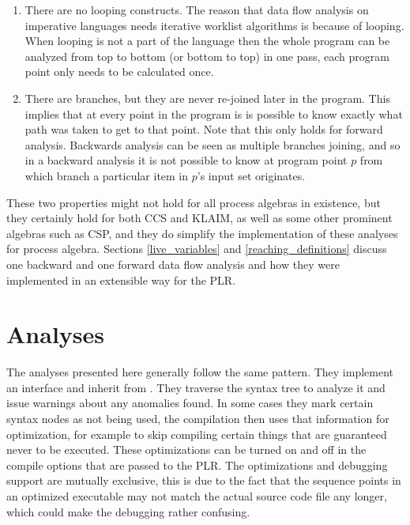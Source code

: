 	\begin{enumerate}
		\item There are no looping constructs. The reason that data flow analysis 
		on imperative languages needs iterative worklist algorithms is because of 
		looping. When looping is not a part of the language then the whole program 
		can be analyzed from top to bottom (or bottom to top) in one pass, each 
		program point only needs to be calculated once.
		
		\item There are branches, but they are never re-joined later in the 
		program. This implies that at every point in the program is is possible to 
		know exactly what path was taken to get to that point. Note that this only 
		holds for forward analysis. Backwards analysis can be seen as multiple 
		branches joining, and so in a backward analysis it is not possible to know 
		at program point $p$ from which branch a particular item in $p$'s input 
		set originates.
		
	\end{enumerate}

	These two properties might not hold for all process algebras in existence, 
	but they certainly hold for both CCS and KLAIM, as well as some other 
	prominent algebras such as CSP, and they do simplify the implementation of 
	these analyses for process algebra. Sections \ref{live_variables} and 
	\ref{reaching_definitions} discuss one backward and one forward data flow 
	analysis and how they were implemented in an extensible way for the PLR.
	
\section{Analyses}
	
	The analyses presented here generally follow the same pattern. They implement
	an  interface and inherit from . 
	They traverse the syntax tree to analyze it and issue warnings about any
	anomalies found. In some cases they mark certain syntax nodes as not being
	used, the compilation then uses that information for optimization, for 
	example to skip compiling certain things that are guaranteed never to be 
	executed. These optimizations can be turned on and off in the compile 
	options that are passed to the PLR. The optimizations and debugging support 
	are mutually exclusive, this is due to the fact that the sequence points in 
	an optimized executable may not match the actual source code file any 
	longer, which could make the debugging rather confusing.
	
